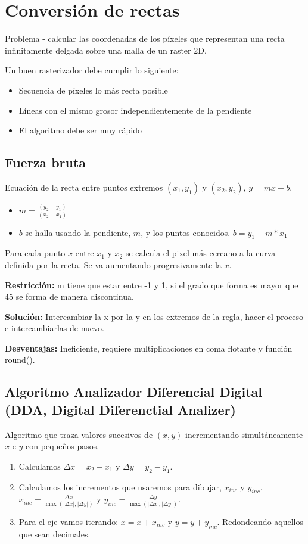 \section{Conversión de rectas}
Problema - calcular las coordenadas de los píxeles que representan una recta infinitamente delgada sobre una malla de un raster 2D.

Un buen rasterizador debe cumplir lo siguiente:
\begin{itemize}
    \item Secuencia de píxeles lo más recta posible
    \item Líneas con el mismo grosor independientemente de la pendiente
    \item El algoritmo debe ser muy rápido
\end{itemize}
 
\subsection{Fuerza bruta}
Ecuación de la recta entre puntos extremos $(x_1 ,y_1)$ y $(x_2 ,y_2 )$, $y=mx+b$.
\begin{itemize}
    \item $m= \frac {(y_2-y_1)}{(x_2-x_1)}$
    \item $b$ se halla usando la pendiente, $m$, y los puntos conocidos. $b=y_1-m*x_1$
\end{itemize}
Para cada punto $x$ entre $x_1$ y $x_2$ se calcula el pixel más cercano a la curva definida por la recta. Se va aumentando progresivamente la $x$.

\textbf{Restricción:} m tiene que estar entre -1 y 1, si el grado que forma es mayor que 45 se forma de manera discontinua.

\textbf{Solución:} Intercambiar la x por la y en los extremos de la regla, hacer el proceso e intercambiarlas de nuevo.

\textbf{Desventajas:} Ineficiente, requiere multiplicaciones en coma flotante y función round().

\subsection{Algoritmo Analizador Diferencial Digital (DDA, Digital Diferenctial Analizer)}

Algoritmo que traza valores sucesivos de $(x, y)$ incrementando simultáneamente $x$ e $y$ con pequeños pasos.

\begin{enumerate}
    \item Calculamos $\Delta x = x_2 -x_1$ y $\Delta y = y_2 -y_1$.
    \item Calculamos los incrementos que usaremos para dibujar, $x_{inc}$ y $y_{inc}$. $x_{inc} = \frac{\Delta x}{\max(|\Delta x|, |\Delta y|)}$ y $y_{inc} = \frac{\Delta y}{\max(|\Delta x|, |\Delta y|)}$.
    \item Para el eje vamos iterando: $x=x+x_{inc}$ y $y=y+y_{inc}$. Redondeando aquellos que sean decimales.
\end{enumerate}

